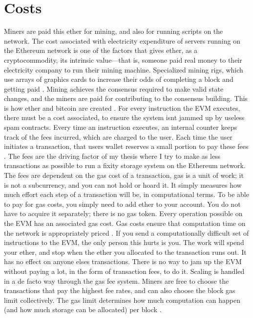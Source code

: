 \section{Costs}
Miners are paid this ether for mining, and also for running scripts on the network. The cost associated with electricity expenditure of servers running on the Ethereum network is one of the factors that gives ether, as a cryptocommodity, its intrinsic value—that is, someone paid real money to their electricity company to run their mining machine. Specialized mining rigs, which use arrays of graphics cards to increase their odds of completing a block and getting paid \cite[12]{dannen2017introducing}. 
Mining achieves the consensus required to make valid state changes, and the miners are paid for contributing to the consensus building. This is how ether and bitcoin are created  \cite[57]{dannen2017introducing}. 
For every instruction the EVM executes, there must be a cost associated, to ensure the system isnt jammed up by useless spam contracts. Every time an instruction executes, an internal counter keeps track of the fees incurred, which are charged to the user. Each time the user initiates a transaction, that users wallet reserves a small portion to pay these fees \cite[58]{dannen2017introducing}. The fees are the driving factor of my thesis where I try to make as less transactions as possible to run a fixity storage system on the Ethereum network. 
The fees are dependent on the gas cost of a transaction, gas is a unit of work; it is not a subcurrency, and you can not hold or hoard it. It simply measures how much effort each step of a transaction will be, in computational terms. To be able to pay for gas costs, you simply need to add ether to your account. You do not have to acquire it separately; there is no gas token. Every operation possible on the EVM has an associated gas cost. Gas costs ensure that computation time on the network is appropriately priced \cite[59]{dannen2017introducing}.
If you send a computationally difficult set of instructions to the EVM, the only person this hurts is you. The work will spend your ether, and stop when the ether you allocated to the transaction runs out. It has no effect on anyone elses transactions. There is no way to jam up the EVM without paying a lot, in the form of transaction fees, to do it. Scaling is handled in a de facto way through the gas fee system. Miners are free to choose the transactions that pay the highest fee rates, and can also choose the block gas limit collectively. The gas limit determines how much computation can happen (and how much storage can be allocated) per block \cite[60]{dannen2017introducing}. 
